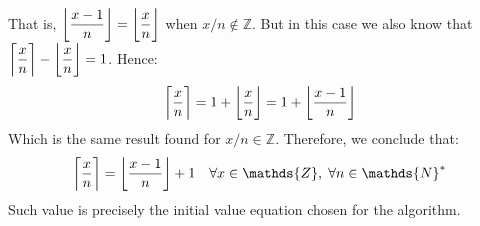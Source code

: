 That is,
$\left\lfloor \dfrac{x - 1}{n} \right\rfloor =
 \left\lfloor \dfrac{x\vphantom{l}}{n} \right\rfloor$
when $x/n \notin \mathds{Z}$.
But in this case we also know that
$\left\lceil \dfrac{x\vphantom{l}}{n} \right\rceil -
 \left\lfloor \dfrac{x\vphantom{l}}{n} \right\rfloor = 1$.
Hence:
\[
  \left\lceil \dfrac{x\vphantom{l}}{n} \right\rceil
  = 1 + \left\lfloor \dfrac{x\vphantom{l}}{n} \right\rfloor
  = 1 + \left\lfloor \dfrac{x - 1}{n} \right\rfloor
\]
Which is the same result found for $x/n \in \mathds{Z}$.
Therefore, we conclude that:
\begin{equation}\label{ceil-x-over-n-as-floor}
  \left\lceil \dfrac{x\vphantom{l}}{n} \right\rceil
  = \left\lfloor \dfrac{x - 1}{n} \right\rfloor + 1
  \quad \forall x \in \mathds{Z}, \; \forall n \in \mathds{N}^*
\end{equation}
Such value is precisely the initial value equation
chosen for the algorithm.
